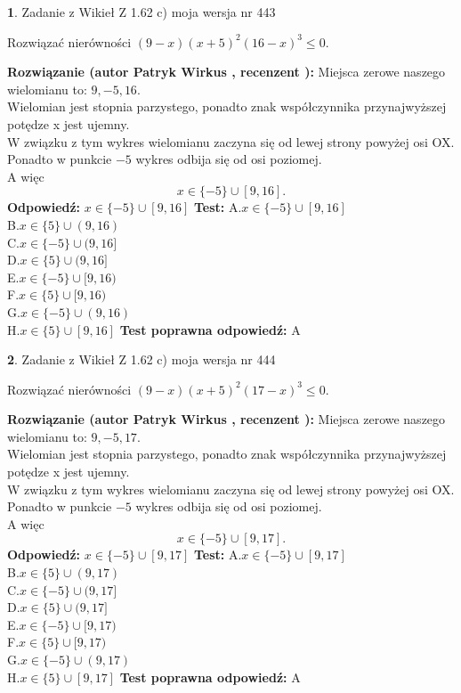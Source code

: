 \documentclass[12pt, a4paper]{article}
\theoremstyle{definition} %
\newtheorem{zad}{}
\newcommand{\zadStart}[1]{\begin{zad}#1\newline}
\newcommand{\zadStop}{\end{zad}}
\newcommand{\rozwStart}[2]{\noindent \textbf{Rozwiązanie (autor #1 , recenzent #2): }\newline}
\newcommand{\rozwStop}{\newline}
\newcommand{\odpStart}{\noindent \textbf{Odpowiedź:}\newline}
\newcommand{\odpStop}{\newline}
\newcommand{\testStart}{\noindent \textbf{Test:}\newline}
\newcommand{\testStop}{\newline}
\newcommand{\kluczStart}{\noindent \textbf{Test poprawna odpowiedź:}\newline}
\newcommand{\kluczStop}{\newline}
\begin{document}
\zadStart{Zadanie z Wikieł Z 1.62 c) moja wersja nr 443}

Rozwiązać nierówności $(9-x)(x+5)^{2}(16-x)^{3}\le0$.
\zadStop
\rozwStart{Patryk Wirkus}{}
Miejsca zerowe naszego wielomianu to: $9, -5, 16$.\\
Wielomian jest stopnia parzystego, ponadto znak współczynnika przy\linebreak najwyższej potędze x jest ujemny.\\ W związku z tym wykres wielomianu zaczyna się od lewej strony powyżej osi OX.\\
Ponadto w punkcie $-5$ wykres odbija się od osi poziomej.\\
A więc $$x \in \{-5\} \cup [9,16].$$
\rozwStop
\odpStart
$x \in \{-5\} \cup [9,16]$
\odpStop
\testStart
A.$x \in \{-5\} \cup [9,16]$\\
B.$x \in \{5\} \cup (9,16)$\\
C.$x \in \{-5\} \cup (9,16]$\\
D.$x \in \{5\} \cup (9,16]$\\
E.$x \in \{-5\} \cup [9,16)$\\
F.$x \in \{5\} \cup [9,16)$\\
G.$x \in \{-5\} \cup (9,16)$\\
H.$x \in \{5\} \cup [9,16]$
\testStop
\kluczStart
A
\kluczStop



\zadStart{Zadanie z Wikieł Z 1.62 c) moja wersja nr 444}

Rozwiązać nierówności $(9-x)(x+5)^{2}(17-x)^{3}\le0$.
\zadStop
\rozwStart{Patryk Wirkus}{}
Miejsca zerowe naszego wielomianu to: $9, -5, 17$.\\
Wielomian jest stopnia parzystego, ponadto znak współczynnika przy\linebreak najwyższej potędze x jest ujemny.\\ W związku z tym wykres wielomianu zaczyna się od lewej strony powyżej osi OX.\\
Ponadto w punkcie $-5$ wykres odbija się od osi poziomej.\\
A więc $$x \in \{-5\} \cup [9,17].$$
\rozwStop
\odpStart
$x \in \{-5\} \cup [9,17]$
\odpStop
\testStart
A.$x \in \{-5\} \cup [9,17]$\\
B.$x \in \{5\} \cup (9,17)$\\
C.$x \in \{-5\} \cup (9,17]$\\
D.$x \in \{5\} \cup (9,17]$\\
E.$x \in \{-5\} \cup [9,17)$\\
F.$x \in \{5\} \cup [9,17)$\\
G.$x \in \{-5\} \cup (9,17)$\\
H.$x \in \{5\} \cup [9,17]$
\testStop
\kluczStart
A
\kluczStop
\end{document}
